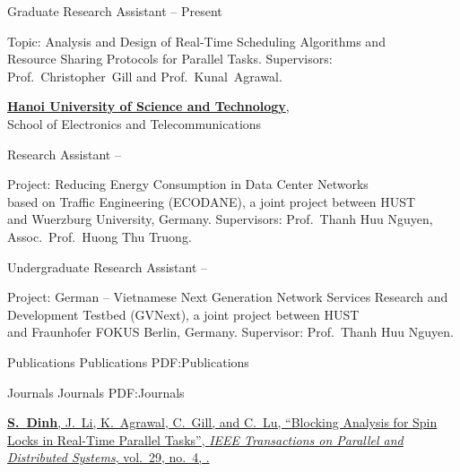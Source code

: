\documentclass[letterpaper,MMMyyyy,nonstopmode]{simpleresumecv}
\begin{document}
\begin{Body}
\Gap
\BulletItem
Graduate Research Assistant
\hfill
{} -- Present
\begin{Detail}
\SubBulletItem
Topic: Analysis and Design of Real-Time Scheduling Algorithms and \\
Resource Sharing Protocols for Parallel Tasks. 
\SubBulletItem
Supervisors:
Prof.~Christopher~Gill and Prof.~Kunal~Agrawal.
\end{Detail}

\BigGap
\Entry
\href{https://en.hust.edu.vn/home}
{\textbf{Hanoi University of Science and Technology}}, \\
School of Electronics and Telecommunications

\Gap
\BulletItem Research Assistant
\hfill
{} -- 
\begin{Detail}
\SubBulletItem
Project: Reducing Energy Consumption in Data Center Networks \\
based on Traffic Engineering (ECODANE), a joint project between HUST \\
and Wuerzburg University, Germany. 
\SubBulletItem
Supervisors: Prof.~Thanh Huu Nguyen, Assoc.~Prof.~Huong Thu Truong.
\end{Detail}

\Gap
\BulletItem Undergraduate Research Assistant
\hfill
{} -- 
\begin{Detail}
\SubBulletItem
Project: German – Vietnamese Next Generation Network Services Research and \\
Development Testbed (GVNext), a joint project between HUST \\
and Fraunhofer FOKUS Berlin, Germany.
\SubBulletItem
Supervisor: Prof.~Thanh Huu Nguyen.
\end{Detail}


\Section
{Publications}
{Publications}
{PDF:Publications}

\SubSection
{Journals}
{Journals}
{PDF:Journals}

\begingroup
\renewcommand{\MaxNumberedItem}{[100]}

\BigGap
\NumberedItem{[1]}
\href{https://ieeexplore.ieee.org/document/8122044/}
{\textbf{S.~Dinh}, J.~Li, K.~Agrawal, C.~Gill, and C.~Lu,
``Blocking Analysis for Spin Locks in Real-Time Parallel Tasks'',
\textit{IEEE Transactions on Parallel and Distributed Systems},
vol.~29,
no.~4,
.}


\end{Body}
\end{document}
